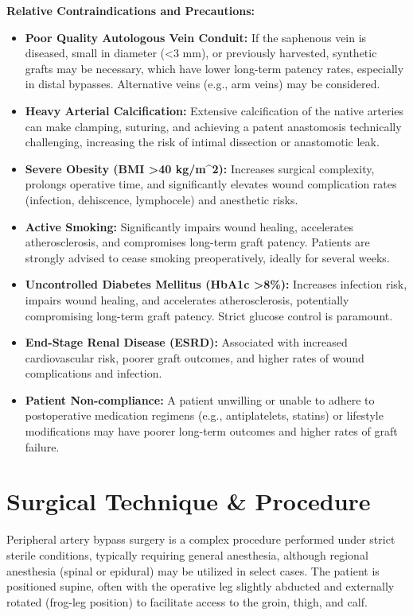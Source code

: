 \textbf{Relative Contraindications and Precautions:}
\begin{itemize}
  \item \textbf{Poor Quality Autologous Vein Conduit:} If the saphenous vein is diseased, small in diameter (<3 mm), or previously harvested, synthetic grafts may be necessary, which have lower long-term patency rates, especially in distal bypasses. Alternative veins (e.g., arm veins) may be considered.
  
  \item \textbf{Heavy Arterial Calcification:} Extensive calcification of the native arteries can make clamping, suturing, and achieving a patent anastomosis technically challenging, increasing the risk of intimal dissection or anastomotic leak.
  
  \item \textbf{Severe Obesity (BMI >40 kg/m\textasciicircum2):} Increases surgical complexity, prolongs operative time, and significantly elevates wound complication rates (infection, dehiscence, lymphocele) and anesthetic risks.
  
  \item \textbf{Active Smoking:} Significantly impairs wound healing, accelerates atherosclerosis, and compromises long-term graft patency. Patients are strongly advised to cease smoking preoperatively, ideally for several weeks.
  
  \item \textbf{Uncontrolled Diabetes Mellitus (HbA1c >8\%):} Increases infection risk, impairs wound healing, and accelerates atherosclerosis, potentially compromising long-term graft patency. Strict glucose control is paramount.
  
  \item \textbf{End-Stage Renal Disease (ESRD):} Associated with increased cardiovascular risk, poorer graft outcomes, and higher rates of wound complications and infection.
  
  \item \textbf{Patient Non-compliance:} A patient unwilling or unable to adhere to postoperative medication regimens (e.g., antiplatelets, statins) or lifestyle modifications may have poorer long-term outcomes and higher rates of graft failure.
\end{itemize}

\section*{Surgical Technique \& Procedure}
Peripheral artery bypass surgery is a complex procedure performed under strict sterile conditions, typically requiring general anesthesia, although regional anesthesia (spinal or epidural) may be utilized in select cases. The patient is positioned supine, often with the operative leg slightly abducted and externally rotated (frog-leg position) to facilitate access to the groin, thigh, and calf.

